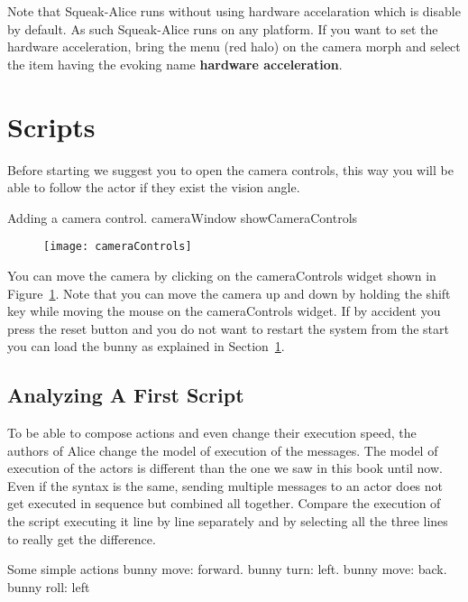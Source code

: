 Note that Squeak-Alice runs without using hardware accelaration which is disable by default. As such Squeak-Alice runs on any platform. If you want to set the hardware acceleration, bring the menu (red halo) on the camera morph and select the item having the evoking name \textbf{hardware acceleration}.  

\section{Scripts}
Before starting we suggest you to open the camera controls, this way you will be able to follow the actor if they exist the vision angle. 

\begin{scriptwithtitle}{Adding a camera control.}
cameraWindow showCameraControls
\end{scriptwithtitle}

\begin{figure}
\begin{center}\texttt{[image: cameraControls]}\end{center}
\caption{ \label{fig:cameraControls}}
\end{figure}

You can move the camera by clicking on the cameraControls widget shown in Figure~\ref{fig:cameraControls}. Note that you can move the camera up and down 
by holding the shift key while moving the mouse on the cameraControls widget. 
If by accident you press the reset button and you do not want to restart the system
from the start you can load the bunny as explained in Section~\ref{}. 

\subsection*{Analyzing A First Script}
To be able to compose actions and even change their execution speed, the authors of Alice change the model of execution of the messages. The model of execution of the actors is different than the one we saw in this book until now. Even if the syntax is the same, sending multiple messages to an actor does not get executed in sequence but combined all together. Compare the execution of the script  executing it line by line separately and by selecting all the three lines to really get the difference.

\begin{scriptwithtitle}{Some simple actions}\label{scr:ssactions}
bunny move: forward.
bunny turn: left.
bunny move: back. 
bunny roll: left
\end{scriptwithtitle}

